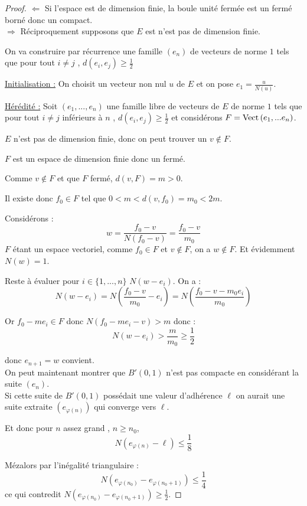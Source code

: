 \begin{proof}
$\Leftarrow$ Si l'espace est de dimension finie, la boule unité fermée est un fermé borné donc un compact.\\

$\Rightarrow$ Réciproquement supposons que $E$ est n'est pas de dimension finie.

On va construire par récurrence une famille  $(e_n)$ de vecteurs de norme $1$ tels que pour tout $i\neq j$ , 
$d(e_i,e_j) \geqslant \frac 1 2$

\uline{Initialisation :} On choisit un vecteur non nul $u$ de $E$ et on pose $e_1=\frac u{N(u)}$.

\uline{Hérédité :} Soit $(e_1,..., e_n)$ une famille libre de vecteurs de $E$ de norme $1$  tels que pour tout $i\neq j$ inférieurs à $n$ , 
$d(e_i,e_j) \geqslant \frac 1 2$
et considérons $F=\operatorname{Vect} \,(e_1,...e_n)$.

$E$ n'est pas de dimension finie, donc on peut trouver un $v \notin F$.

$F$ est un espace de dimension finie donc un fermé.

Comme $v \notin F $ et que $F$ fermé, $d(v,F)=m>0$.

Il existe donc $f_0\in F$ tel que $0<m<d(v,f_0)=m_0<2 m$.

Considérons : \[w=\frac{f_0-v}{N(f_0-v)}=\frac{f_0-v}{m_0}\]
$F$ étant un espace vectoriel, comme $f_0 \in F$ et $v \notin F$, on a  $w\notin F$.
Et évidemment $N(w)=1$.

Reste à évaluer pour $i \in \{1,...,n\}$ $N(w-e_i)$.
On a :
\[N(w-e_i)=N\left(\frac{f_0-v}{m_0}-e_i\right)=N\left(\frac{f_0-v-m_0 e_i}{m_0}\right)\]

Or $f_0-me_i \in F$ donc $N(f_0-me_i-v)>m$ donc :
\[N(w-e_i)> \frac{m}{m_0}\geqslant \frac 1 2\]

donc $e_{n+1}=w$ convient. \\

On peut maintenant montrer que $B'(0,1)$ n'est pas compacte en considérant la suite  $(e_n)$.\\
Si cette suite de $B'(0,1)$ possédait une valeur d'adhérence $\ell$ on aurait une suite extraite 
$(e_{\varphi(n)})$ qui converge vers $\ell$.

Et donc pour $n$ assez grand , $n\geqslant n_0$, 
\[N(e_{\varphi(n)}-\ell) \leqslant \frac 1 8\]
 
Mézalors par l'inégalité triangulaire : \[N(e_{\varphi(n_0)}-e_{\varphi(n_0+1)})\leqslant \frac 1 4\]
ce qui contredit $N(e_{\varphi(n_0)}-e_{\varphi(n_0+1)}) \geqslant \frac 1 2$.
\end{proof}


